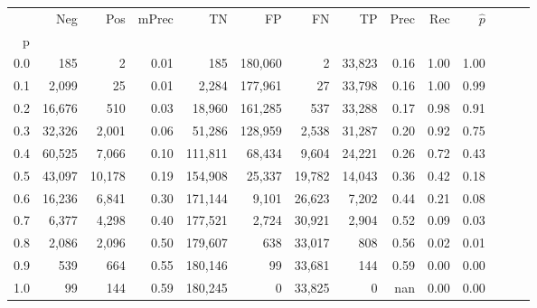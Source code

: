 \begin{tabular}{rrrrrrrrrrrrrr}
\toprule
{} &     Neg &     Pos & mPrec &       TN &       FP &      FN &      TP &  Prec &   Rec & $\hat{p}$ \\
p   &         &         &       &          &          &         &         &       &       &           \\
\midrule
0.0 &     185 &       2 &  0.01 &      185 &  180,060 &       2 &  33,823 &  0.16 &  1.00 &      1.00 \\
0.1 &   2,099 &      25 &  0.01 &    2,284 &  177,961 &      27 &  33,798 &  0.16 &  1.00 &      0.99 \\
0.2 &  16,676 &     510 &  0.03 &   18,960 &  161,285 &     537 &  33,288 &  0.17 &  0.98 &      0.91 \\
0.3 &  32,326 &   2,001 &  0.06 &   51,286 &  128,959 &   2,538 &  31,287 &  0.20 &  0.92 &      0.75 \\
0.4 &  60,525 &   7,066 &  0.10 &  111,811 &   68,434 &   9,604 &  24,221 &  0.26 &  0.72 &      0.43 \\
0.5 &  43,097 &  10,178 &  0.19 &  154,908 &   25,337 &  19,782 &  14,043 &  0.36 &  0.42 &      0.18 \\
0.6 &  16,236 &   6,841 &  0.30 &  171,144 &    9,101 &  26,623 &   7,202 &  0.44 &  0.21 &      0.08 \\
0.7 &   6,377 &   4,298 &  0.40 &  177,521 &    2,724 &  30,921 &   2,904 &  0.52 &  0.09 &      0.03 \\
0.8 &   2,086 &   2,096 &  0.50 &  179,607 &      638 &  33,017 &     808 &  0.56 &  0.02 &      0.01 \\
0.9 &     539 &     664 &  0.55 &  180,146 &       99 &  33,681 &     144 &  0.59 &  0.00 &      0.00 \\
1.0 &      99 &     144 &  0.59 &  180,245 &        0 &  33,825 &       0 &   nan &  0.00 &      0.00 \\
\bottomrule
\end{tabular}
